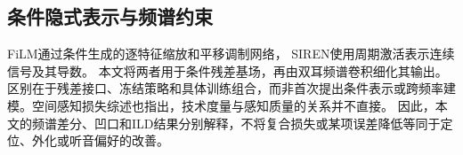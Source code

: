 \subsection{条件隐式表示与频谱约束}
FiLM通过条件生成的逐特征缩放和平移调制网络\cite{R7}，%
SIREN使用周期激活表示连续信号及其导数\cite{R11}。%
本文将两者用于条件残差基场，再由双耳频谱卷积细化其输出。区别在于残差接口、冻结策略和具体训练组合，而非首次提出条件表示或跨频率建模。空间感知损失综述也指出，技术度量与感知质量的关系并不直接\cite{R18}。%
因此，本文的频谱差分、凹口和ILD结果分别解释，不将复合损失或某项误差降低等同于定位、外化或听音偏好的改善。
